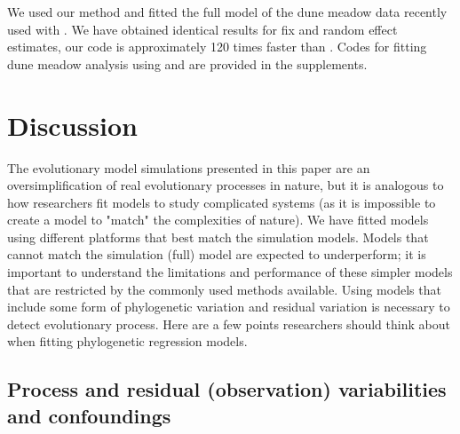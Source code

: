 \documentclass[12pt]{article}
\begin{document}

We used our method and fitted the full model of the dune meadow data recently used with  \cite{li2017canfun}. 
We have obtained identical results for fix and random effect estimates, our code is approximately 120 times faster than . 
Codes for fitting dune meadow analysis using  and  are provided in the supplements. 

\newpage

\section{Discussion}



The evolutionary model simulations presented in this paper are an oversimplification of real evolutionary processes in nature, but it is analogous to how researchers fit models to study complicated systems (as it is impossible to create a model to "match" the complexities of nature).
We have fitted models using different platforms that best match the simulation models. 
Models that cannot match the simulation (full) model are expected to underperform; it is important to understand the limitations and performance of these simpler models that are restricted by the commonly used methods available.
Using models that include some form of phylogenetic variation and residual variation is necessary to detect evolutionary process.
Here are a few points researchers should think about when fitting phylogenetic regression models.

\subsection{Process and residual (observation) variabilities and confoundings}
\end{document}
